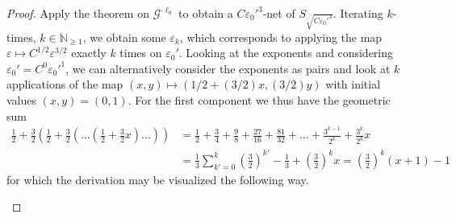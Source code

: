\documentclass[10pt]{amsart}
\theoremstyle{definition}
\theoremstyle{remark}
\begin{document}
\begin{proof}
        Apply the theorem on \(\mathcal{G}^{\cdot \ell_0}\) to obtain a \(C\varepsilon_0'^3\)-net of \(S_{\sqrt{C\varepsilon_0'^3}}\). Iterating \(k\)-times, \(k \in \mathbb{N}_{\geq 1}\), we obtain some \(\varepsilon_k\), which corresponds to applying the map \(\varepsilon \mapsto C^{1/2}\varepsilon^{3/2}\) exactly \(k\) times on \(\varepsilon_0'\). Looking at the exponents and considering \(\varepsilon_0' = C^0\varepsilon_0'^1\), we can alternatively consider the exponents as pairs and look at \(k\) applications of the map \((x, y) \mapsto (1/2+(3/2) x, (3/2) y)\) with initial values \((x, y) = (0, 1)\). For the first component we thus have the geometric sum
        \begin{align}
            \frac{1}{2} + \frac{3}{2}\left(\frac{1}{2} + \frac{3}{2}\left(...\left(\frac{1}{2} + \frac{3}{2}x\right)...\right)\right) &= \frac{1}{2} + \frac{3}{4} + \frac{9}{8} + \frac{27}{16} + \frac{81}{32} + ... + \frac{3^{k-1}}{2^k} + \frac{3^k}{2^k} x\\
            &= \frac{1}{3} \sum_{k'=0}^k \left(\frac{3}{2}\right)^{k'} - \frac{1}{3} + \left(\frac{3}{2}\right)^k x = \left(\frac{3}{2}\right)^k (x+1) - 1
        \end{align}
        for which the derivation may be visualized the following way.
        \begin{figure}[!hbtp]
\end{figure}
\end{proof}
\end{document}
